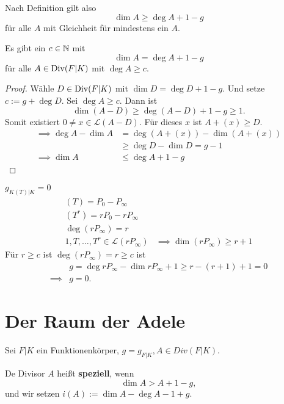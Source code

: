 \begin{bemerkungnr}
    Nach Definition gilt also 
    $$ \dim A \geq \deg A + 1 -g $$
    für alle $A$ mit Gleichheit für mindestens ein $A$.
\end{bemerkungnr}

\begin{theorem}[Riemann]
    Es gibt ein $c \in \mathbb{N}$ mit $$ \dim A = \deg A +1 -g$$
    für alle $A \in \operatorname{Div}(F|K)$ mit $\deg A \geq c$.
\end{theorem}
\begin{proof}
    Wähle $D \in \operatorname{Div}(F|K)$ mit $\dim D = \deg D + 1 - g$.
    Und setze $c := g + \deg D$. Sei $\deg A \geq c$.
    Dann ist 
    $$\dim (A-D) \geq \deg(A-D) + 1 -g \geq 1.$$
    Somit existiert $0 \ne x \in \mathcal{L}(A-D)$. 
    Für dieses $x$ ist $A + (x) \geq D$.
    \begin{align*}
        \implies \deg A - \dim A &= \deg (A + (x)) - \dim (A + (x))\\
        & \geq \deg D - \dim D = g - 1\\
        \implies \dim A &\leq \deg A + 1 - g
    \end{align*} 
\end{proof}

\begin{beispiel}
    $g_{K(T)|K} = 0$
    \begin{align*}
        (T) = P_0 - P_\infty&\\
        (T^r) = r P_0 - r P_\infty&\\
        \deg(rP_\infty) = r&\\
        1,T,\ldots,T^r \in \mathcal{L}(rP_\infty) &\implies \dim(rP_\infty) \geq r +1
    \end{align*}
    Für $r \geq c$ ist $\deg(rP_\infty) = r \geq c$ ist
    \begin{align*}
        & g = \deg rP_\infty - \dim rP_\infty + 1 \geq r - (r+1) + 1 = 0\\
        \implies & g=0.
    \end{align*}
\end{beispiel}

\section{Der Raum der Adele}
Sei $F|K$ ein Funktionenkörper, $g = g_{F|K}, A \in Div(F|K)$.

\begin{definition}
    De Divisor $A$ heißt \textbf{speziell}, wenn 
    $$ \dim A > A + 1 - g,$$
    und wir setzen $i(A) := \dim A - \deg A - 1 +g$.
\end{definition}

